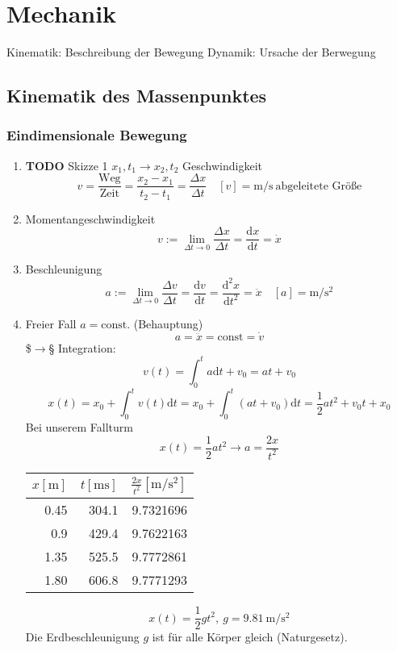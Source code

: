 \documentclass[11pt]{article}
\begin{document}
\section{Mechanik}
\label{sec-7}
Kinematik: Beschreibung der Bewegung
Dynamik: Ursache der Berwegung

\subsection{Kinematik des Massenpunktes}
\label{sec-7-1}
\subsubsection{Eindimensionale Bewegung}
\label{sec-7-1-1}
\begin{enumerate}
\item {\bfseries\sffamily TODO} Skizze 1
\label{sec-7-1-1-1}
$x_1,t_1 \longrightarrow x_2, t_2$
Geschwindigkeit
\[v = \frac{\text{Weg}}{\text{Zeit}} = \frac{x_2 - x_1}{t_2 - t_1} = \frac{\Delta x}{\Delta t}\quad [v] = \si{\meter\per\second}~\text{abgeleitete Größe}\]
\item Momentangeschwindigkeit
\label{sec-7-1-1-2}
\[v := \lim_{\Delta t\to 0} \frac{\Delta{x}}{\Delta t} = \frac{\mathrm{d}x}{\mathrm{d}t} = \dot{x}\]
\item Beschleunigung
\label{sec-7-1-1-3}
\[a := \lim_{\Delta t\to 0} \frac{\Delta{v}}{\Delta{t}} = \frac{\mathrm{d}v}{\mathrm{d}t} = \frac{\mathrm{d}^2x}{\mathrm{d}t^2} = \ddot{x}\quad [a]=\si{\meter\per\second\squared}\]
\item Freier Fall
\label{sec-7-1-1-4}
$a = \text{const.}$ (Behauptung)
\[a=\ddot{x} = \text{const} = \dot{v}\]
\$$\rightarrow$§ Integration: \[v(t) = \int_0^t a\mathrm{d}t + v_0 = a t + v_0\]
\[x(t) = x_0 + \int_0^t v(t)\mathrm{d}t = x_0 + \int_0^t (a t + v_0)\mathrm{d}t = \frac{1}{2}a t^2 + v_0 t + x_0\]
Bei unserem Fallturm
\[x(t) = \frac{1}{2}a t^2 \rightarrow a = \frac{2 x}{t^2}\]
\begin{center}
\begin{tabular}{rrr}
$x[\si{\meter}]$ & $t[\si{\milli\second}]$ & $\frac{2x}{t^2}[\si{\meter\per\square\second}]$\\
\hline
0.45 & 304.1 & 9.7321696\\
0.9 & 429.4 & 9.7622163\\
1.35 & 525.5 & 9.7772861\\
1.80 & 606.8 & 9.7771293\\
\end{tabular}
\end{center}
\[x(t) = \frac{1}{2} g t^2,~g=\SI{9.81}{\meter\per\square\second}\]
Die Erdbeschleunigung $g$ ist für alle Körper gleich (Naturgesetz).
\end{enumerate}
\end{document}
